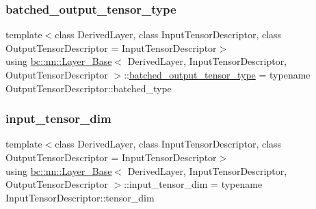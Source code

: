 \mbox{\label{structbc_1_1nn_1_1Layer__Base_a5dbb24a3cc7949d33ca9f4edbfbe871a}} 
\subsubsection{\texorpdfstring{batched\+\_\+output\+\_\+tensor\+\_\+type}{batched\_output\_tensor\_type}}
{\footnotesize\ttfamily template$<$class Derived\+Layer, class Input\+Tensor\+Descriptor, class Output\+Tensor\+Descriptor = Input\+Tensor\+Descriptor$>$ \\
using \hyperlink{structbc_1_1nn_1_1Layer__Base}{bc\+::nn\+::\+Layer\+\_\+\+Base}$<$ Derived\+Layer, Input\+Tensor\+Descriptor, Output\+Tensor\+Descriptor $>$\+::\hyperlink{structbc_1_1nn_1_1Layer__Output__Base_a1de6ba739a49078d6cc6d169e85e8d4f}{batched\+\_\+output\+\_\+tensor\+\_\+type} =  typename Output\+Tensor\+Descriptor\+::batched\+\_\+type}

\mbox{\label{structbc_1_1nn_1_1Layer__Base_a12d1f8cb3fac0409305a38b37ba1ccd2}} 
\subsubsection{\texorpdfstring{input\+\_\+tensor\+\_\+dim}{input\_tensor\_dim}}
{\footnotesize\ttfamily template$<$class Derived\+Layer, class Input\+Tensor\+Descriptor, class Output\+Tensor\+Descriptor = Input\+Tensor\+Descriptor$>$ \\
using \hyperlink{structbc_1_1nn_1_1Layer__Base}{bc\+::nn\+::\+Layer\+\_\+\+Base}$<$ Derived\+Layer, Input\+Tensor\+Descriptor, Output\+Tensor\+Descriptor $>$\+::input\+\_\+tensor\+\_\+dim =  typename Input\+Tensor\+Descriptor\+::tensor\+\_\+dim}

\mbox{\label{structbc_1_1nn_1_1Layer__Base_a0f7ef852a6ab48c732c099eb4108b43d}} 
